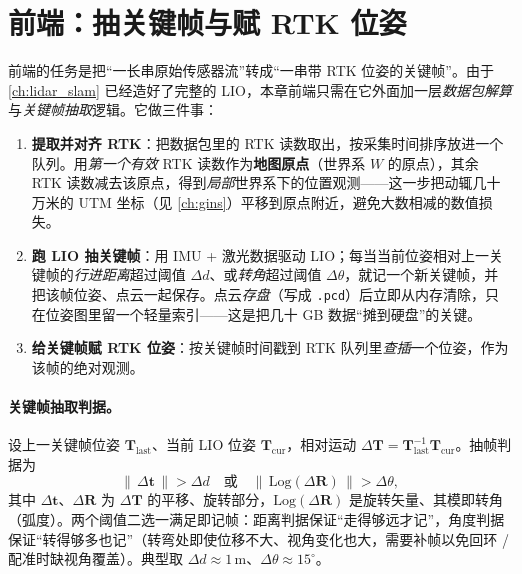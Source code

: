 \section{前端：抽关键帧与赋 RTK 位姿}
\label{sec:lidar-map-frontend}

前端的任务是把“一长串原始传感器流”转成“一串带 RTK 位姿的关键帧”。由于 \cref{ch:lidar_slam} 已经造好了完整的 LIO，本章前端只需在它外面加一层\emph{数据包解算}与\emph{关键帧抽取}逻辑\cite{gao2023slamad}。它做三件事：

\begin{enumerate}
  \item \textbf{提取并对齐 RTK}：把数据包里的 RTK 读数取出，按采集时间排序放进一个队列。用\emph{第一个有效} RTK 读数作为\textbf{地图原点}（世界系 $W$ 的原点），其余 RTK 读数减去该原点，得到\emph{局部}世界系下的位置观测——这一步把动辄几十万米的 UTM 坐标（见 \cref{ch:gins}）平移到原点附近，避免大数相减的数值损失。
  \item \textbf{跑 LIO 抽关键帧}：用 IMU + 激光数据驱动 LIO；每当当前位姿相对上一关键帧的\emph{行进距离}超过阈值 $\Delta d$、或\emph{转角}超过阈值 $\Delta\theta$，就记一个新关键帧，并把该帧位姿、点云一起保存。点云\emph{存盘}（写成 \texttt{.pcd}）后立即从内存清除，只在位姿图里留一个轻量索引——这是把几十 GB 数据“摊到硬盘”的关键。
  \item \textbf{给关键帧赋 RTK 位姿}：按关键帧时间戳到 RTK 队列里\emph{查插}一个位姿，作为该帧的绝对观测。
\end{enumerate}

\paragraph{关键帧抽取判据。}
设上一关键帧位姿 $\mathbf{T}_{\text{last}}$、当前 LIO 位姿 $\mathbf{T}_{\text{cur}}$，相对运动 $\Delta\mathbf{T}=\mathbf{T}_{\text{last}}^{-1}\mathbf{T}_{\text{cur}}$。抽帧判据为
\begin{equation}
\label{eq:lidar-map-kf}
\big\|\,\Delta\mathbf{t}\,\big\|>\Delta d \quad\text{或}\quad \big\|\,\mathrm{Log}(\Delta\mathbf{R})\,\big\|>\Delta\theta,
\end{equation}
其中 $\Delta\mathbf{t}$、$\Delta\mathbf{R}$ 为 $\Delta\mathbf{T}$ 的平移、旋转部分，$\mathrm{Log}(\Delta\mathbf{R})$ 是旋转矢量、其模即转角（弧度）。两个阈值二选一满足即记帧：距离判据保证“走得够远才记”，角度判据保证“转得够多也记”（转弯处即使位移不大、视角变化也大，需要补帧以免回环 / 配准时缺视角覆盖）。典型取 $\Delta d\approx 1$\,m、$\Delta\theta\approx 15^\circ$。

